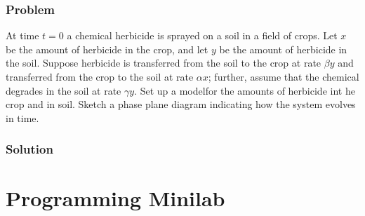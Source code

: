 \documentclass[12pt]{article}
\begin{document}
\subsubsection*{Problem}
At time $t=0$ a chemical herbicide is sprayed on a soil in a field of crops. Let
$x$ be the amount of herbicide in the crop, and let $y$ be the amount of
herbicide in the soil. Suppose herbicide is transferred from the soil to the
crop at rate $\beta y$ and transferred from the crop to the soil at rate $\alpha
x$; further, assume that the chemical degrades in the soil at rate $\gamma y$.
Set up a modelfor the amounts of herbicide int he crop and in soil. Sketch a
phase plane diagram indicating how the system evolves in time.
\subsubsection*{Solution}
\todo[]

\section{Programming Minilab}
\todo[]
\end{document}
